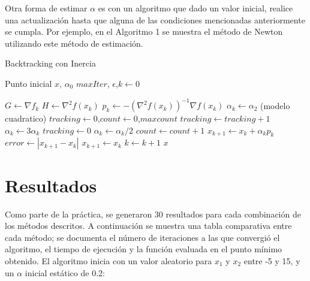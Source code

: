 \documentclass[10pt,journal,compsoc]{styles/IEEEtran}
\begin{document}
Otra forma de estimar $\alpha$ es con un algoritmo que dado un valor inicial, realice una actualizaci\'on hasta que alguna de las condiciones mencionadas anteriormente se cumpla. Por ejemplo, en el Algoritmo 1 se muestra el m\'etodo de Newton utilizando este m\'etodo de estimaci\'on.

 \begin{algorithm}   
	\caption{Backtracking con Inercia}  
	\label{alg1}
	\begin{algorithmic} 
		\REQUIRE Punto inicial $x$, $\alpha_0$ $maxIter$, $\epsilon$,$k \leftarrow 0$
		
			\STATE $G \leftarrow \nabla f_k$
			\STATE $H \leftarrow \nabla^{2}f(x_k)$
			\STATE $p_k \leftarrow -(\nabla^{2}f(x_k))^{-1} \nabla f(x_k)$
			\STATE $\alpha_k \leftarrow \alpha_2$ (modelo cuadratico)
			\STATE $tracking \leftarrow 0$,$count \leftarrow 0$,$maxcount$
				\STATE $tracking \leftarrow tracking+1$
					\STATE $\alpha_k \leftarrow 3\alpha_k$
					\STATE $tracking \leftarrow 0$
				\ELSE
					\STATE $\alpha_k \leftarrow \alpha_k/2$				
				\ENDIF
				\STATE $count \leftarrow count+1$
			\ENDWHILE
			\STATE $x_{k+1} \leftarrow x_k+\alpha_k p_k$
			\STATE $error \leftarrow |x_{k+1}-x_k|$
			\STATE $x_{k+1} \leftarrow x_k$
			\STATE $k \leftarrow k+1$
		\ENDWHILE
		\RETURN $x$
	\end{algorithmic}
\end{algorithm}


\section{Resultados}

Como parte de la pr\'actica, se generaron 30 resultados para cada combinaci\'on de los m\'etodos descritos. A continuaci\'on se muestra una tabla comparativa entre cada m\'etodo; se documenta el n\'umero de iteraciones a las que convergi\'o el algoritmo, el tiempo de ejecuci\'on y la funci\'on evaluada en el punto m\'inimo obtenido. El algoritmo inicia con un valor aleatorio para $x_1$ y $x_2$ entre -5 y 15, y un $\alpha$ inicial est\'atico de 0.2:\\
\end{document}
